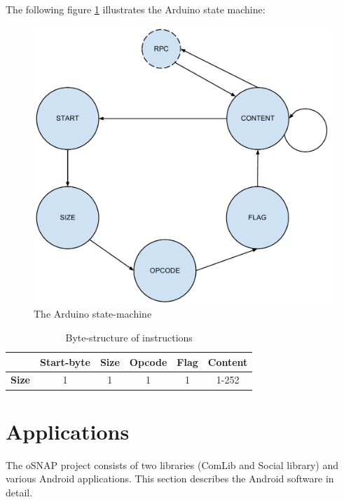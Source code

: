 The following figure \ref{fig:arduino_states} illustrates the Arduino state machine:

\begin{figure}[h!]
	\centering
	\includegraphics[width=\textwidth, keepaspectratio]{img/arduino_state-machine.pdf}
	\caption{The Arduino state-machine}
	\label{fig:arduino_states}
\end{figure}

\begin{table}[H]
	\begin{tabular}{c|c|c|c|c|c|}
		\cline{2-6}
		& \textbf{Start-byte} & \textbf{Size} & \textbf{Opcode} & \textbf{Flag} & \textbf{Content} \\
		\hline
		\multicolumn{1}{|c|}{\textbf{Size}} & 1 & 1 & 1 & 1 & 1-252 \\
		\hline
	\end{tabular}
	\caption{Byte-structure of instructions}
	\label{tbl:instr_struct}
\end{table}


\section{Applications}
The oSNAP project consists of two libraries (ComLib and Social library) and
various Android applications. This section describes the Android software in detail.

